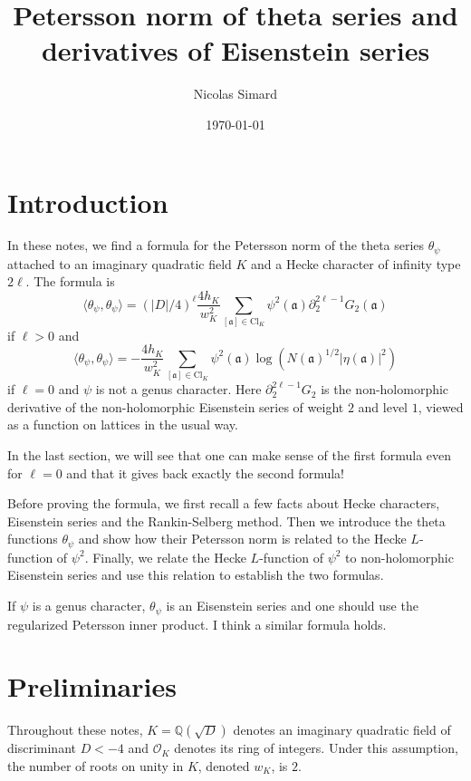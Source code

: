 \documentclass[twoside,10pt]{article}
\author{Nicolas Simard}
\date{\today}
\title{Petersson norm of theta series and derivatives of Eisenstein series}
\newcommand{\Q}{\mathbb{Q}}
\newcommand{\ida}{\mathfrak{a}}
\newcommand{\del}{\partial}
\newcommand{\Clk}{\text{Cl}_K}
\renewcommand{\O}{\mathcal{O}}
\newcommand{\tpsi}{\theta_\psi}
\begin{document}
\maketitle
\tableofcontents

\section*{Introduction}
In these notes, we find a formula for the Petersson norm of the theta series $\tpsi$ attached to an imaginary quadratic field $K$ and a Hecke character of infinity type $2\ell$. The formula is
\begin{equation}\label{form:lgreater0}
\langle\tpsi,\tpsi\rangle=(|D|/4)^\ell\frac{4h_K}{w_K^2}\sum_{[\ida]\in\Clk}\psi^2(\ida)\del_2^{2\ell-1}G_{2}(\ida)
\end{equation}
if $\ell>0$ and
\begin{equation}\label{form:leq0}
\langle\tpsi,\tpsi\rangle =-\frac{4h_K}{w_K^2}\sum_{[\ida]\in\Clk}\psi^2(\ida)\log(N(\ida)^{1/2}|\eta(\ida)|^2)
\end{equation}
if $\ell=0$ and $\psi$ is not a genus character. Here $\del_2^{2\ell-1}G_2$ is the non-holomorphic derivative of the non-holomorphic Eisenstein series of weight $2$ and level $1$, viewed as a function on lattices in the usual way.

In the last section, we will see that one can make sense of the first formula even for $\ell=0$ and that it gives back exactly the second formula!

Before proving the formula, we first recall a few facts about Hecke characters, Eisenstein series and the Rankin-Selberg method. Then we introduce the theta functions $\tpsi$ and show how their Petersson norm is related to the Hecke $L$-function of $\psi^2$. Finally, we relate the Hecke $L$-function of $\psi^2$ to non-holomorphic Eisenstein series and use this relation to establish the two formulas.

If $\psi$ is a genus character, $\tpsi$ is an Eisenstein series and one should use the regularized Petersson inner product. I think a similar formula holds.

\section{Preliminaries}
Throughout these notes, $K=\Q(\sqrt{D})$ denotes an imaginary quadratic field of discriminant $D<-4$ and $\O_K$ denotes its ring of integers. Under this assumption, the number of roots on unity in $K$, denoted $w_K$, is $2$.
\end{document}
